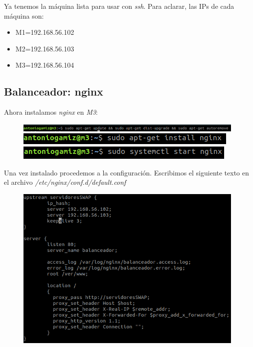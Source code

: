 \documentclass[12pt]{article}
\begin{document}
Ya tenemos la máquina lista para usar con \textit{ssh}. Para aclarar, las IPs de cada máquina son:
\begin{itemize}
\item M1=192.168.56.102
\item M2=192.168.56.103
\item M3=192.168.56.104
\end{itemize}

\subsection{Balanceador: nginx}

Ahora instalamos \textit{nginx} en \textit{M3}:\medskip

\begin{figure}[H]
\includegraphics[scale=0.5]{4.png}
\includegraphics[scale=0.5]{5.png}
\includegraphics[scale=0.5]{6.png}
\end{figure}

Una vez instalado procedemos a la configuración. Escribimos el siguiente texto en el archivo \textit{/etc/nginx/conf.d/default.conf}

\begin{figure}[H]
\center
\includegraphics[scale=0.5]{7.png}
\end{figure}
\end{document}
